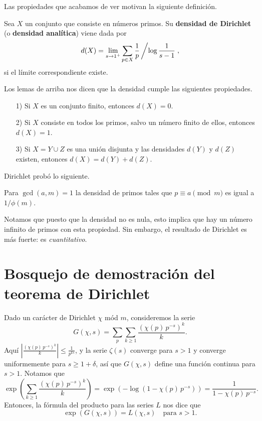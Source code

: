 \vspace{1em}

Las propiedades que acabamos de ver motivan la siguiente definición.

\begin{definicion}
  Sea $X$ un conjunto que consiste en números primos.
  Su \textbf{densidad de Dirichlet} (o \textbf{densidad analítica})
  viene dada por
  $$d (X) = \lim_{s \to 1^+} \sum_{p \in X} \frac{1}{p}\left/\log \frac{1}{s-1}\right.,$$
  si el límite correspondiente existe.
\end{definicion}

Los lemas de arriba nos dicen que la densidad cumple las siguientes propiedades.

\begin{enumerate}
\item[1)] Si $X$ es un conjunto finito, entonces $d (X) = 0$.

\item[2)] Si $X$ consiste en todos los primos, salvo un número finito de ellos,
  entonces $d (X) = 1$.

\item[3)] Si $X = Y \cup Z$ es una unión disjunta y las densidades $d (Y)$ y
  $d (Z)$ existen, entonces $d (X) = d (Y) + d (Z)$.
\end{enumerate}

Dirichlet probó lo siguiente.

\begin{teorema}
  Para $\gcd (a,m) = 1$ la densidad de primos tales que $p \equiv a \pmod{m}$
  es igual a $1/\phi(m)$.
\end{teorema}

Notamos que puesto que la densidad no es nula, esto implica que hay un número
infinito de primos con esta propiedad. Sin embargo, el resultado de Dirichlet
es más fuerte: es \emph{cuantitativo}.


\section{Bosquejo de demostración del teorema de Dirichlet}

Dado un carácter de Dirichlet $\chi$ mód $m$, consideremos la serie
$$G (\chi, s) = \sum_p \sum_{k\ge 1} \frac{(\chi (p)\,p^{-s})^k}{k}.$$
Aquí $\left|\frac{(\chi (p)\,p^{-s})^k}{k}\right| \le \frac{1}{p^{ks}}$,
y la serie $\zeta (s)$ converge para $s > 1$ y converge uniformemente para
$s \ge 1 + \delta$, así que $G (\chi,s)$ define una función continua para
$s > 1$. Notamos que
\[ \exp \left(\sum_{k\ge 1} \frac{(\chi (p)\,p^{-s})^k}{k}\right) =
\exp (-\log (1 - \chi (p)\,p^{-s})) = \frac{1}{1 - \chi(p)\,p^{-s}}. \]
Entonces, la fórmula del producto para las series $L$ nos dice que
$$\exp (G (\chi,s)) = L (\chi,s) \quad\text{para }s > 1.$$

